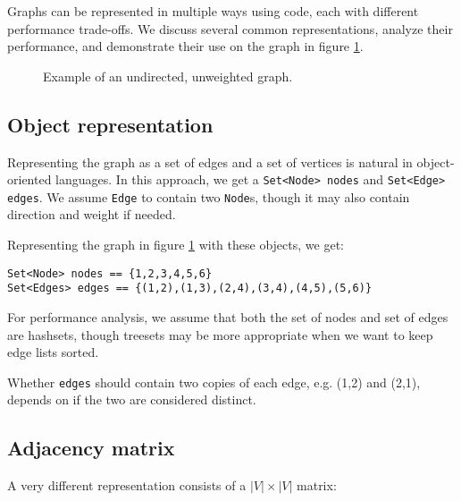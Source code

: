 \documentclass{article}
\begin{document}
Graphs can be represented in multiple ways using code, each with different performance trade-offs.  We discuss several common representations, analyze their performance, and demonstrate their use on the graph in figure \ref{graph}.

\begin{figure}
\centering
{}
\caption{Example of an undirected, unweighted graph. \label{graph}}
\end{figure}

\subsection{Object representation}
Representing the graph as a set of edges and a set of vertices is natural in object-oriented languages.  In this approach, we get a \texttt{Set<Node> nodes} and \texttt{Set<Edge> edges}.  We assume \texttt{Edge} to contain two \texttt{Node}s, though it may also contain direction and weight if needed.

Representing the graph in figure \ref{graph} with these objects, we get:
\begin{verbatim}
Set<Node> nodes == {1,2,3,4,5,6}
Set<Edges> edges == {(1,2),(1,3),(2,4),(3,4),(4,5),(5,6)}
\end{verbatim}

For performance analysis, we assume that both the set of nodes and set of edges are hashsets, though treesets may be more appropriate when we want to keep edge lists sorted.

Whether \texttt{edges} should contain two copies of each edge, e.g. (1,2) and (2,1), depends on if the two are considered distinct.

\subsection{Adjacency matrix}
A very different representation consists of a $|V|\times |V|$ matrix:
\end{document}
